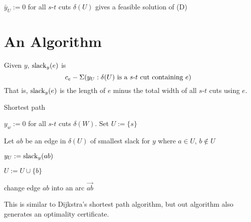 \begin{remark}
    $ \bar{y}_U:=0 $ for all $s$-$t$ cuts $ \delta(U) $ gives a feasible
    solution of (D)
\end{remark}

\section{An Algorithm}
Given $ y $, $\operatorname{slack}_{y} (e)$ is
\[ c_e-\Sigma(y_U :\delta(U) \text{ is a $s$-$t$ cut containing $ e $}) \]
That is, $ \operatorname{slack}_y(e) $ is the length of $ e $ minus the total width of all
$s$-$t$ cuts using $ e $.


\begin{algbox}
    \begin{algorithm}[H]
        \caption{Shortest path}
        $ y_w := 0 $ for all $s$-$t$ cuts $ \delta(W) $. Set $ U:=\{s\} $

         {
            Let $ ab $ be an edge in $ \delta(U) $ of smallest slack for $ y $
            where $ a\in U $, $ b\notin U $

            $ y_U:=\operatorname{slack}_y(ab) $

            $ U:=U\cup \{b\} $

            change edge $ ab $ into an arc $ \vec{ab} $
        }

    \end{algorithm}
\end{algbox}

This is similar to Dijkstra's shortest path algorithm, but out algorithm
also generates an optimality certificate.

